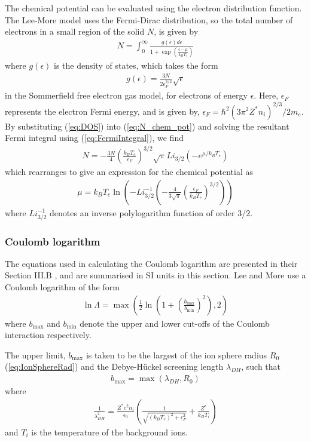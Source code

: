\documentclass[12pt]{article}
\numberwithin{equation}{section}
\begin{document}
The chemical potential can be evaluated using the electron distribution function. The Lee-More model uses the Fermi-Dirac distribution, so the total number of electrons in a small region of the solid $N$, is given by
%
\begin{align} \label{eq:N_chem_pot}
  N = \int_0^\infty \frac{g(\epsilon) d\epsilon}{1+\exp\left(\frac{\epsilon-\mu}{k_BT_e}\right)}
\end{align}
%
where $g(\epsilon)$ is the density of states, which takes the form
%
\begin{align} \label{eq:DOS}
  g(\epsilon) = \frac{3N}{2\epsilon_F^{3/2}}\sqrt{\epsilon}
\end{align} 
%
in the Sommerfield free electron gas model, for electrons of energy $\epsilon$. Here, $\epsilon_F$ represents the electron Fermi energy, and is given by, $\epsilon_F=\hbar^2(3\pi^2Z^*n_i)^{2/3}/2m_e$. By substituting (\ref{eq:DOS}) into (\ref{eq:N_chem_pot}) and solving the resultant Fermi integral using (\ref{eq:FermiIntegral}), we find
%
\begin{align}
  N = -\frac{3N}{4}\left(\frac{k_BT_e}{\epsilon_F}\right)^{3/2}\sqrt{\pi}Li_{3/2}\left(-e^{\mu/k_BT_e}\right)
\end{align}
%
which rearranges to give an expression for the chemical potential as
%
\begin{align} \label{eq:chem_pot}
  \mu = k_BT_e\ln\left(-Li_{3/2}^{-1}\left(-\frac{4}{3\sqrt{\pi}}\left(\frac{\epsilon_F}{k_BT_e}\right)^{3/2}\right)\right)
\end{align}
%
where $Li_{3/2}^{-1}$ denotes an inverse polylogarithm function of order 3/2. 

\subsubsection{Coulomb logarithm} \label{sec:theory:resistivity:coulog}

The equations used in calculating the Coulomb logarithm are presented in their Section III.B \cite{eta:LeeMore}, and are summarised in SI units in this section. Lee and More use a Coulomb logarithm of the form
%
\begin{align}
  \ln\Lambda = \max\left(\frac{1}{2}\ln\left(1+\left(\frac{b_\text{max}}{b_\text{min}}\right)^2\right), 2 \right)
\end{align}
%
where $b_\text{max}$ and $b_\text{min}$ denote the upper and lower cut-offs of the Coulomb interaction respectively. 

The upper limit, $b_\text{max}$ is taken to be the largest of the ion sphere radius $R_0$ (\ref{eq:IonSphereRad}) and the Debye-H\"{u}ckel screening length $\lambda_{DH}$, such that
%
\begin{align}
  b_\text{max} = \max(\lambda_{DH}, R_0)
\end{align}
%
where
%
\begin{align} \label{eq:theory:resistivity:Debye-Huckel}
  \frac{1}{\lambda_{DH}^2} = \frac{Z^*e^2n_i}{\epsilon_0}\left(\frac{1}{\sqrt{(k_BT_e)^2 + \epsilon_F^2}} + \frac{Z^*}{k_BT_i} \right)
\end{align}
%
and $T_i$ is the temperature of the background ions.
\end{document}
